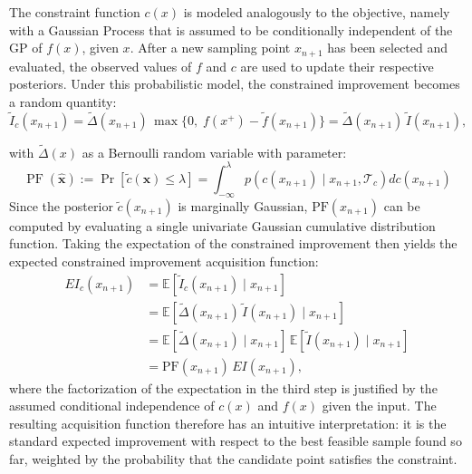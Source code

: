 The constraint function $c(x)$ is modeled analogously to the objective, namely with a Gaussian Process that is assumed to be conditionally independent of the GP of $f(x)$, given $x$. After a new sampling point $x_{n+1}$ has been selected and evaluated, the observed values of $f$ and $c$ are used to update their respective posteriors. Under this probabilistic model, the constrained improvement becomes a random quantity:
\begin{equation}
    \tilde{I}_c(x_{n+1}) = \tilde{\Delta}(x_{n+1})\, \max\{0,\; f(x^+) - \tilde{f}(x_{n+1})\} = \tilde{\Delta}(x_{n+1})\, \tilde{I}(x_{n+1}),
\end{equation}

with $\tilde{\Delta}(x)$ as a Bernoulli random variable with parameter:
\begin{equation}\label{eq::bernoulli}
\operatorname{PF}(\hat{\mathbf{x}}):=\operatorname{Pr}[\tilde{c}(\mathbf{x}) \leq \lambda]=\int_{-\infty}^\lambda p\left(c(x_{n+1}) \mid x_{n+1}, \mathcal{T}_c\right) d c(x_{n+1})
\end{equation}
Since the posterior $\tilde{c}(x_{n+1})$ is marginally Gaussian, $\mathrm{PF}(x_{n+1})$ can be computed by evaluating a single univariate Gaussian cumulative distribution function. Taking the expectation of the constrained improvement then yields the expected constrained improvement acquisition function:
\begin{equation}\label{eq::addingconstraint2EI}
\begin{aligned}
EI_c(x_{n+1}) &= \mathbb{E}\left[\tilde{I}_c(x_{n+1}) \mid x_{n+1}\right] \\
&= \mathbb{E}\left[\tilde{\Delta}(x_{n+1})\, \tilde{I}(x_{n+1}) \mid x_{n+1}\right] \\
&= \mathbb{E}\left[\tilde{\Delta}(x_{n+1}) \mid x_{n+1}\right]\, \mathbb{E}\left[\tilde{I}(x_{n+1}) \mid x_{n+1}\right] \\
&= \mathrm{PF}(x_{n+1})\, EI(x_{n+1}),
\end{aligned}
\end{equation}
where the factorization of the expectation in the third step is justified by the assumed conditional independence of $c(x)$ and $f(x)$ given the input. The resulting acquisition function therefore has an intuitive interpretation: it is the standard expected improvement with respect to the best feasible sample found so far, weighted by the probability that the candidate point satisfies the constraint.

